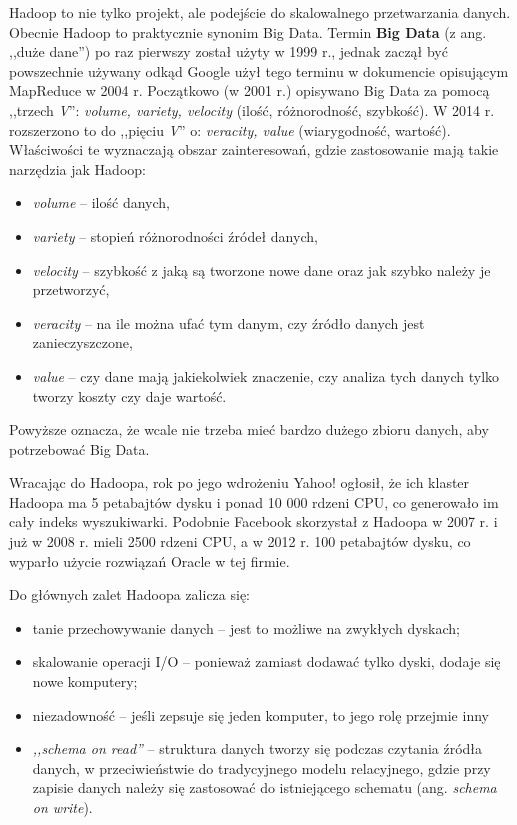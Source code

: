 \documentclass[12pt,a4paper,twoside,titlepage,openright]{book}
\begin{document}
Hadoop to nie tylko projekt, ale podejście do skalowalnego przetwarzania danych. \cite{hadoop} Obecnie Hadoop to praktycznie synonim Big Data. \cite{bigData} Termin \textbf{Big Data} (z ang. ,,duże dane'') po raz pierwszy został użyty w 1999 r., jednak zaczął być powszechnie używany odkąd Google użył tego terminu w dokumencie opisującym MapReduce w 2004 r. Początkowo (w 2001 r.) opisywano Big Data za pomocą ,,trzech \textit{V}'': \textit{volume, variety, velocity} (ilość, różnorodność, szybkość). W 2014 r. rozszerzono to do ,,pięciu \textit{V}'' o: \textit{veracity, value} (wiarygodność, wartość).\cite{realTimeProcessing} Właściwości te wyznaczają obszar zainteresowań, gdzie zastosowanie mają takie narzędzia jak Hadoop:
\begin{itemize}
\item \textit{volume} -- ilość danych,
\item \textit{variety} -- stopień różnorodności źródeł danych,
\item \textit{velocity} -- szybkość z jaką są tworzone nowe dane oraz jak szybko należy je przetworzyć,
\item \textit{veracity} -- na ile można ufać tym danym, czy źródło danych jest zanieczyszczone,
\item \textit{value} -- czy dane mają jakiekolwiek znaczenie, czy analiza tych danych tylko tworzy koszty czy daje wartość.
\end{itemize}
Powyższe oznacza, że wcale nie trzeba mieć bardzo dużego zbioru danych, aby potrzebować Big Data. \cite{hadoop}

Wracając do Hadoopa, rok po jego wdrożeniu Yahoo! ogłosił, że ich klaster Hadoopa ma 5 petabajtów dysku i ponad 10 000 rdzeni CPU, co generowało im cały indeks wyszukiwarki. Podobnie Facebook skorzystał z Hadoopa w 2007 r. i już w 2008 r. mieli 2500 rdzeni CPU, a w 2012 r. 100 petabajtów dysku, co wyparło użycie rozwiązań Oracle w tej firmie.

Do głównych zalet Hadoopa zalicza się:
\begin{itemize}
\item tanie przechowywanie danych -- jest to możliwe na zwykłych dyskach;
\item skalowanie operacji I/O -- ponieważ zamiast dodawać tylko dyski, dodaje się nowe komputery;
\item niezadowność -- jeśli zepsuje się jeden komputer, to jego rolę przejmie inny
\item \textit{,,schema on read''} -- struktura danych tworzy się podczas czytania źródła danych, w przeciwieństwie do tradycyjnego modelu relacyjnego, gdzie przy zapisie danych należy się zastosować do istniejącego schematu (ang. \textit{schema on write}).
\end{itemize}
\end{document}
